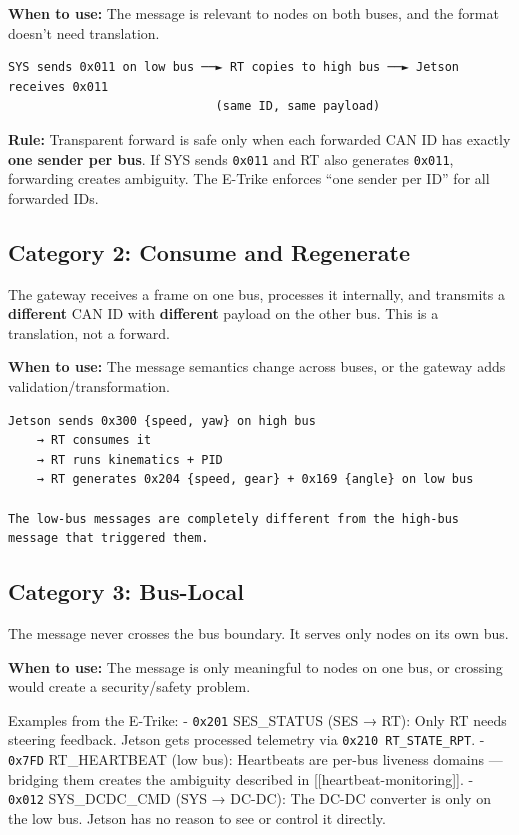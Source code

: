 \documentclass[12pt,a4paper,oneside]{report}
\begin{document}
\textbf{When to use:} The message is relevant to nodes on both buses, and the
format doesn't need translation.

\begin{verbatim}
SYS sends 0x011 on low bus ──► RT copies to high bus ──► Jetson receives 0x011
                             (same ID, same payload)
\end{verbatim}

\textbf{Rule:} Transparent forward is safe only when each forwarded CAN ID has
exactly \textbf{one sender per bus}. If SYS sends \texttt{0x011} and RT also
generates \texttt{0x011}, forwarding creates ambiguity. The E-Trike enforces
``one sender per ID'' for all forwarded IDs.

\subsection{Category 2: Consume and
Regenerate}\label{category-2-consume-and-regenerate}

The gateway receives a frame on one bus, processes it internally, and transmits
a \textbf{different} CAN ID with \textbf{different} payload on the other bus.
This is a translation, not a forward.

\textbf{When to use:} The message semantics change across buses, or the gateway
adds validation/transformation.

\begin{verbatim}
Jetson sends 0x300 {speed, yaw} on high bus
    → RT consumes it
    → RT runs kinematics + PID
    → RT generates 0x204 {speed, gear} + 0x169 {angle} on low bus

The low-bus messages are completely different from the high-bus message that triggered them.
\end{verbatim}

\subsection{Category 3: Bus-Local}\label{category-3-bus-local}

The message never crosses the bus boundary. It serves only nodes on its own bus.

\textbf{When to use:} The message is only meaningful to nodes on one bus, or
crossing would create a security/safety problem.

Examples from the E-Trike: - \texttt{0x201} SES\_STATUS (SES → RT): Only RT
needs steering feedback. Jetson gets processed telemetry via
\texttt{0x210\ RT\_STATE\_RPT}. - \texttt{0x7FD} RT\_HEARTBEAT (low bus):
Heartbeats are per-bus liveness domains --- bridging them creates the ambiguity
described in {[}{[}heartbeat-monitoring{]}{]}. - \texttt{0x012} SYS\_DCDC\_CMD
(SYS → DC-DC): The DC-DC converter is only on the low bus. Jetson has no reason
to see or control it directly.
\end{document}
